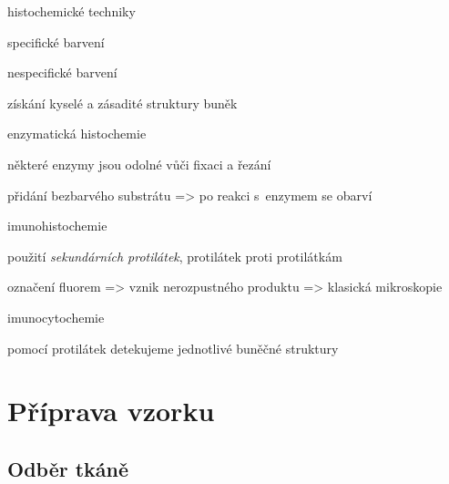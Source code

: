 \documentclass[DIV=8]{scrreprt}
\begin{document}
\begin{myItemize}[nosep]
    \item histochemické techniky
\begin{myItemize}[nosep]
    \item specifické barvení
    \item nespecifické barvení
\begin{myItemize}[nosep]
    \item získání kyselé a zásadité struktury buněk
\end{myItemize}

\end{myItemize}

    \item enzymatická histochemie
\begin{myItemize}[nosep]
    \item některé enzymy jsou odolné vůči fixaci a řezání
\begin{myItemize}[nosep]
    \item přidání bezbarvého substrátu => po reakci s enzymem se obarví
\end{myItemize}

\end{myItemize}

    \item imunohistochemie
\begin{myItemize}[nosep]
    \item použití \emph{sekundárních protilátek}, protilátek proti protilátkám
    \item označení fluorem => vznik nerozpustného produktu => klasická mikroskopie
\end{myItemize}

    \item imunocytochemie
\begin{myItemize}[nosep]
    \item pomocí protilátek detekujeme jednotlivé buněčné struktury
\end{myItemize}

\end{myItemize}



\section{Příprava vzorku} \label{Příprava vzorku} \FloatBarrier


\subsection{Odběr tkáně} \label{Odběr tkáně}
\end{document}
